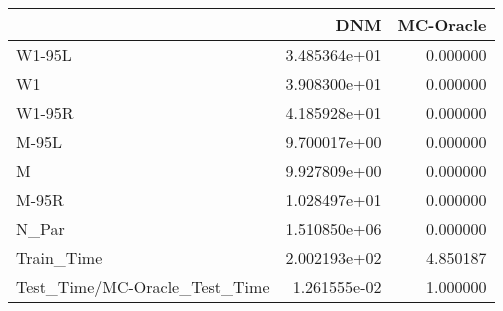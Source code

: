 \begin{tabular}{lrr}
\toprule
{} &           DNM &  MC-Oracle \\
\midrule
W1-95L                        &  3.485364e+01 &   0.000000 \\
W1                            &  3.908300e+01 &   0.000000 \\
W1-95R                        &  4.185928e+01 &   0.000000 \\
M-95L                         &  9.700017e+00 &   0.000000 \\
M                             &  9.927809e+00 &   0.000000 \\
M-95R                         &  1.028497e+01 &   0.000000 \\
N\_Par                         &  1.510850e+06 &   0.000000 \\
Train\_Time                    &  2.002193e+02 &   4.850187 \\
Test\_Time/MC-Oracle\_Test\_Time &  1.261555e-02 &   1.000000 \\
\bottomrule
\end{tabular}
